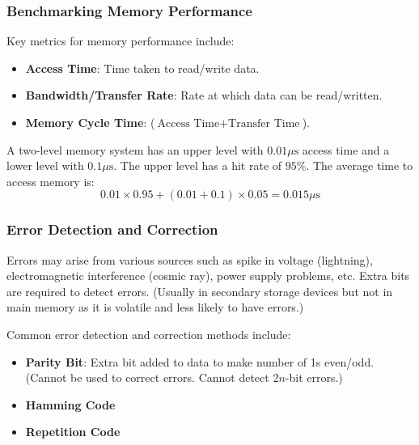 \subsubsection{Benchmarking Memory Performance}

Key metrics for memory performance include:
\begin{itemize}
    \item \textbf{Access Time}: Time taken to read/write data.
    \item \textbf{Bandwidth/Transfer Rate}: Rate at which data can be read/written.
    \item \textbf{Memory Cycle Time}: ($\text{Access Time} + \text{Transfer Time}$).
\end{itemize}

\begin{example}
    A two-level memory system has an upper level with $0.01\mu \text{s}$ access time and
    a lower level with $0.1\mu \text{s}$. The upper level has a hit rate of $95\%$. The
    average time to access memory is:
    \begin{equation*}
        0.01 \times 0.95 + (0.01 + 0.1) \times 0.05 = 0.015\mu \text{s}
    \end{equation*}
\end{example}

\subsubsection{Error Detection and Correction}

Errors may arise from various sources such as spike in voltage (lightning), electromagnetic
interference (cosmic ray), power supply problems, etc. Extra bits are required to detect errors.
(Usually in secondary storage devices but not in main memory as it is volatile and less likely
to have errors.)

Common error detection and correction methods include:
\begin{itemize}
    \item \textbf{Parity Bit}: Extra bit added to data to make number of 1s even/odd.
        (Cannot be used to correct errors. Cannot detect 2$n$-bit errors.)
    \item \textbf{Hamming Code}
    \item \textbf{Repetition Code}
\end{itemize}